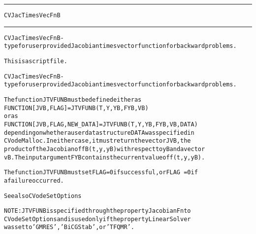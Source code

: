 \begin{samepage}
\hrule
\begin{center}
{\large \verb!CVJacTimesVecFnB!}
\label{p:CVJacTimesVecFnB}
\end{center}
\hrule\vspace{0.1in}



\begin{alltt}
CVJacTimesVecFnB - type for user provided Jacobian times vector function for backward problems.
\end{alltt}

\end{samepage}



\begin{samepage}


\begin{alltt}
This is a script file. 
\end{alltt}

\end{samepage}



\begin{alltt}
CVJacTimesVecFnB - type for user provided Jacobian times vector function for backward problems.

   The function JTVFUNB must be defined either as
        FUNCTION [JVB, FLAG] = JTVFUNB(T,Y,YB,FYB,VB)
   or as
        FUNCTION [JVB, FLAG, NEW_DATA] = JTVFUNB(T,Y,YB,FYB,VB,DATA)
   depending on whether a user data structure DATA was specified in
   CVodeMalloc. In either case, it must return the vector JVB, the
   product of the Jacobian of fB(t,y,yB) with respect to yB and a vector
   vB. The input argument FYB contains the current value of f(t,y,yB).

   The function JTVFUNB must set FLAG=0 if successful, or FLAG~=0 if
   a failure occurred.

   See also CVodeSetOptions

   NOTE: JTVFUNB is specified through the property JacobianFn to
   CVodeSetOptions and is used only if the property LinearSolver
   was set to 'GMRES', 'BiCGStab', or 'TFQMR'.
\end{alltt}






\vspace{0.1in}